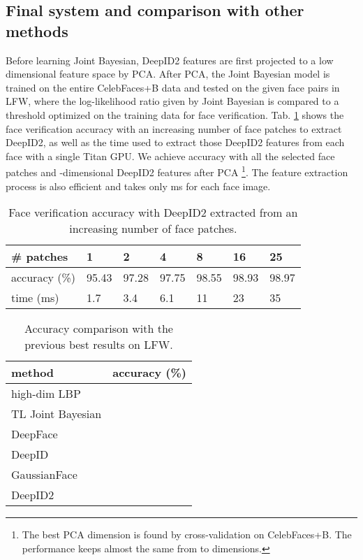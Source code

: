 \documentclass{article} \usepackage{nips14submit_e,times}
\begin{document}
\subsection{Final system and comparison with other methods}
\label{ssec:compare}

Before learning Joint Bayesian, DeepID2 features are first projected to a low dimensional feature space by PCA. After PCA, the Joint Bayesian model is trained on the entire CelebFaces+B data and tested on the  given face pairs in LFW, where the log-likelihood ratio given by Joint Bayesian is compared to a threshold optimized on the training data for face verification. Tab. \ref{tab:patchnum} shows the face verification accuracy with an increasing number of face patches to extract DeepID2, as well as the time used to extract those DeepID2 features from each face with a single Titan GPU. We achieve  accuracy with all the  selected face patches and -dimensional DeepID2 features after PCA \footnote{The best PCA dimension is found by cross-validation on CelebFaces+B. The performance keeps almost the same from  to  dimensions.}. The feature extraction process is also efficient and takes only  ms for each face image.

\begin{table}[t]
\caption{Face verification accuracy with DeepID2 extracted from an increasing number of face patches.}
\label{tab:patchnum}
\vspace{-0.0in}
\begin{center}
\begin{tabular}{p{55pt}|p{23pt}p{23pt}p{23pt}p{23pt}p{23pt}p{23pt}}
\toprule
\# patches & 1 & 2 & 4 & 8 & 16 & 25 \\
\midrule
accuracy (\%)   & 95.43 & 97.28 & 97.75 & 98.55 & 98.93 & 98.97 \\
time (ms) & 1.7 & 3.4 & 6.1 & 11 & 23 & 35 \\
\bottomrule
\end{tabular}
\end{center}
\vspace{-0.17in}
\end{table}

\begin{table}[t]
\caption{Accuracy comparison with the previous best results on LFW.}
\label{tab:compare}
\vspace{-0.0in}
\begin{center}
\begin{tabular}{p{100pt}|p{100pt}}
\toprule
method & accuracy (\%) \\
\midrule
high-dim LBP \cite{chen2013} &  \\
TL Joint Bayesian \cite{cao2013} &  \\
DeepFace \cite{taigman2014} &  \\
DeepID \cite{sun2014} &  \\
GaussianFace \cite{lu2014} &  \\
DeepID2 &  \\
\bottomrule
\end{tabular}
\end{center}
\vspace{-0.17in}
\end{table}
\end{document}
